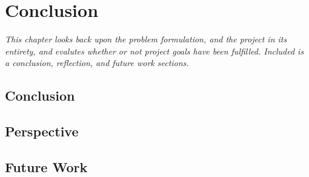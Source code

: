 \chapter{Conclusion}

\textit{This chapter looks back upon the problem formulation, and the project in its entirety, and evalutes whether or not project goals have been fulfilled. Included is a conclusion, reflection, and future work sections.}

\section{Conclusion}
\label{ConclusionSec}

\section{Perspective}
\label{Perspective}

\section{Future Work}
\label{conclusion:FutureWork}
